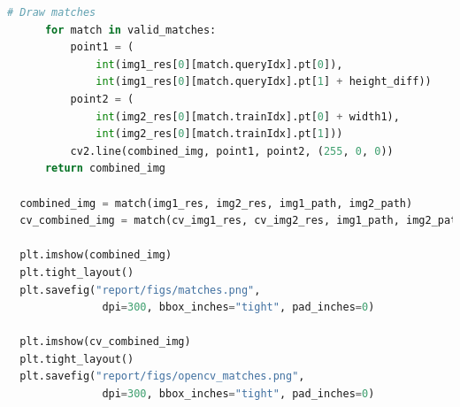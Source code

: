 \documentclass[11pt,a4paper]{article}
\begin{document}
\begin{lstlisting}[language=Python, caption=Matching keypoints]
      # Draw matches
      for match in valid_matches:
          point1 = (
              int(img1_res[0][match.queryIdx].pt[0]),
              int(img1_res[0][match.queryIdx].pt[1] + height_diff))
          point2 = (
              int(img2_res[0][match.trainIdx].pt[0] + width1),
              int(img2_res[0][match.trainIdx].pt[1]))
          cv2.line(combined_img, point1, point2, (255, 0, 0))
      return combined_img

  combined_img = match(img1_res, img2_res, img1_path, img2_path)
  cv_combined_img = match(cv_img1_res, cv_img2_res, img1_path, img2_path)

  plt.imshow(combined_img)
  plt.tight_layout()
  plt.savefig("report/figs/matches.png",
               dpi=300, bbox_inches="tight", pad_inches=0)

  plt.imshow(cv_combined_img)
  plt.tight_layout()
  plt.savefig("report/figs/opencv_matches.png",
               dpi=300, bbox_inches="tight", pad_inches=0)
\end{lstlisting}
\end{document}
